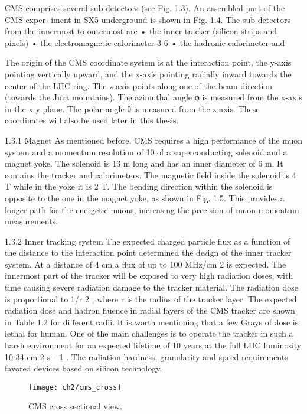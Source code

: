 CMS comprises several sub detectors (see Fig. 1.3). An assembled part of the CMS exper-
iment in SX5 underground is shown in Fig. 1.4. The sub detectors from the innermost to
outermost are
• the inner tracker (silicon strips and pixels)
• the electromagnetic calorimeter
3
6
• the hadronic calorimeter and


The origin of the CMS coordinate system is at the interaction point, the y-axis pointing
vertically upward, and the x-axis pointing radially inward towards the center of the LHC
ring. The z-axis points along one of the beam direction (towards the Jura mountains). The
azimuthal angle φ is measured from the x-axis in the x-y plane. The polar angle θ is measured
from the z-axis. These coordinates will also be used later in this thesis.


1.3.1 Magnet
As mentioned before, CMS requires a high performance of the muon system and a momentum
resolution of 10%
of a superconducting solenoid and a magnet yoke. The solenoid is 13 m long and has an
inner diameter of 6 m. It contains the tracker and calorimeters. The magnetic field inside
the solenoid is 4 T while in the yoke it is 2 T. The bending direction within the solenoid is
opposite to the one in the magnet yoke, as shown in Fig. 1.5. This provides a longer path for
the energetic muons, increasing the precision of muon momentum measurements.


1.3.2 Inner tracking system
The expected charged particle flux as a function of the distance to the interaction point
determined the design of the inner tracker system. At a distance of 4 cm a flux of up to 100
MHz/cm 2 is expected. The innermost part of the tracker will be exposed to very high radiation
doses, with time causing severe radiation damage to the tracker material. The radiation dose is proportional to 1/r 2 , where r is the radius of the tracker layer. The expected radiation dose
and hadron fluence in radial layers of the CMS tracker are shown in Table 1.2 for different
radii. It is worth mentioning that a few Grays of dose is lethal for human. One of the main
challenges is to operate the tracker in such a harsh environment for an expected lifetime of 10
years at the full LHC luminosity 10 34 cm 2 s −1 . The radiation hardness, granularity and speed
requirements favored devices based on silicon technology.



\begin{figure}[!h]
	\centering
	\texttt{[image: ch2/cms\_cross]}
	\caption[CMS cross sectional view]{CMS cross sectional view.}
	\label{cmscross}
\end{figure}

